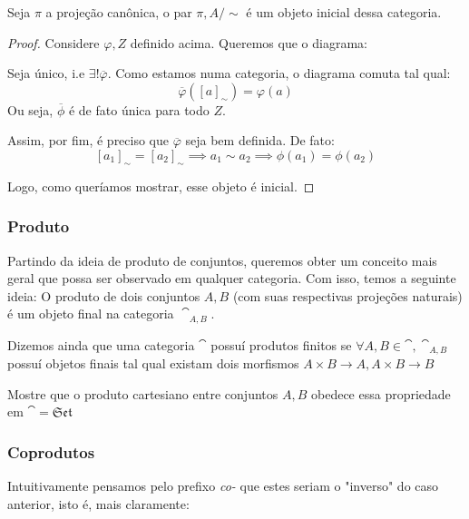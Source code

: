 \documentclass[../main]{subfiles}
\begin{document}
    \begin{prop}
        Seja \(\pi\) a projeção canônica, o par \(\pi, A/\sim\) é um objeto
        inicial dessa categoria.
    \end{prop}
    \begin{proof}
        Considere \(\varphi, Z\) definido acima. Queremos que o diagrama:
        \begin{center}
        \end{center}
        Seja único, i.e \(\exists! \overline \varphi\). Como estamos numa
        categoria, o diagrama comuta tal qual:
        \[\overline \varphi([a]_\sim) = \varphi(a)\] Ou seja, \(\overline \phi\)
        é de fato única para todo \(Z\). 

        Assim, por fim, é preciso que \(\overline \varphi\) seja bem definida.
        De fato:
        \[[a_1]_\sim = [a_2]_\sim \implies a_1 \sim a_2 \implies \phi(a_1) =
        \phi(a_2)\]

        Logo, como queríamos mostrar, esse objeto é inicial.
    \end{proof}
    \subsubsection*{Produto}
    Partindo da ideia de produto de conjuntos, queremos obter um conceito mais
    geral que possa ser observado em qualquer categoria. Com isso, temos a
    seguinte ideia: O produto de dois conjuntos \(A, B\) (com suas respectivas
    projeções naturais) é um objeto final na categoria \(\cat_{A, B}\). 
    
    Dizemos ainda que uma categoria \(\cat\) possuí produtos finitos se
    \(\forall A, B \in \cat, \cat_{A, B}\) possuí objetos finais tal qual
    existam dois morfismos \(A \times B \to A, A \times B \to B\)  

    \begin{exercise}
        Mostre que o produto cartesiano entre conjuntos \(A, B\) obedece essa
        propriedade em \(\cat = \mathfrak{Set}\)
    \end{exercise}

\subsubsection*{Coprodutos}
Intuitivamente pensamos pelo prefixo \textit{co-} que estes seriam o "inverso"
do caso anterior, isto é, mais claramente:
\end{document}
